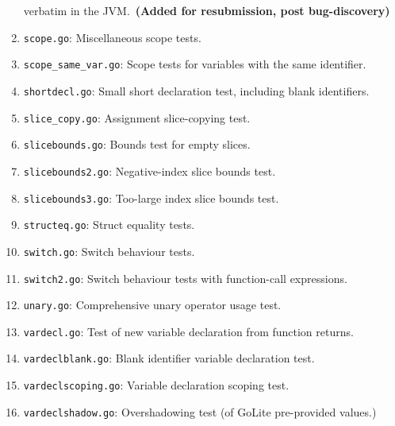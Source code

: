 \documentclass[11pt]{article}
\begin{document}
\begin{enumerate}
      verbatim in the JVM.~\textbf{(Added for resubmission, post bug-discovery)}
\item \texttt{scope.go}: Miscellaneous scope tests.
\item \texttt{scope\_same\_var.go}: Scope tests for variables with the same identifier.
\item \texttt{shortdecl.go}: Small short declaration test, including blank identifiers.
\item \texttt{slice\_copy.go}: Assignment slice-copying test.
\item \texttt{slicebounds.go}: Bounds test for empty slices.
\item \texttt{slicebounds2.go}: Negative-index slice bounds test.
\item \texttt{slicebounds3.go}: Too-large index slice bounds test.
\item \texttt{structeq.go}: Struct equality tests.
\item \texttt{switch.go}: Switch behaviour tests.
\item \texttt{switch2.go}: Switch behaviour tests with function-call expressions.
\item \texttt{unary.go}: Comprehensive unary operator usage test.
\item \texttt{vardecl.go}: Test of new variable declaration from function returns.
\item \texttt{vardeclblank.go}: Blank identifier variable declaration test.
\item \texttt{vardeclscoping.go}: Variable declaration scoping test.
\item \texttt{vardeclshadow.go}: Overshadowing test (of GoLite pre-provided values.)
\end{enumerate}
\end{document}
